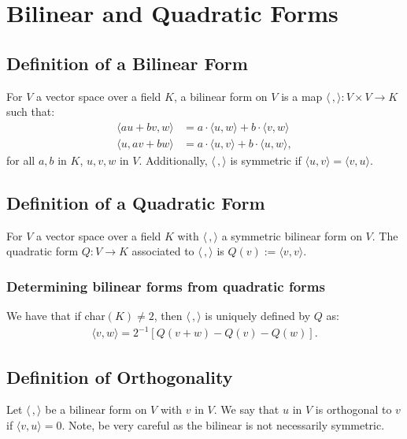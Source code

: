 \section{Bilinear and Quadratic Forms}

\subsection{Definition of a Bilinear Form}

For $V$ a vector space over a field $K$, a bilinear form on $V$ is a map $\langle\,,\rangle : V \times V \to K$
such that: \begin{align*}
  \langle au + bv, w \rangle &= a \cdot \langle u, w \rangle + b \cdot \langle v, w \rangle \\
  \langle u, av + bw \rangle &= a \cdot \langle u, v \rangle + b \cdot \langle u, w \rangle,
\end{align*} for all $a, b$ in $K$, $u, v, w$ in $V$. Additionally, $\langle\,,\rangle$ is symmetric if 
$\langle u, v \rangle = \langle v, u \rangle$.

\subsection{Definition of a Quadratic Form}

For $V$ a vector space over a field $K$ with $\langle \, , \rangle$ a symmetric bilinear form on
$V$. The quadratic form $Q : V \to K$ associated to $\langle \, , \rangle$ is 
$Q(v) := \langle v, v \rangle$.

\subsubsection{Determining bilinear forms from quadratic forms}

We have that if char$(K) \neq 2$, then $\langle \, , \rangle$ is uniquely defined by $Q$ as:
\begin{gather*}
  \langle v, w \rangle = 2^{-1}\left[Q(v + w) - Q(v) - Q(w) \right]. 
\end{gather*} 

\subsection{Definition of Orthogonality}

Let $\langle \, , \rangle$ be a bilinear form on $V$ with $v$ in $V$. We say that $u$ in $V$ is 
orthogonal to $v$ if $\langle v, u \rangle = 0$. Note, be very careful as the bilinear is not
necessarily symmetric.

